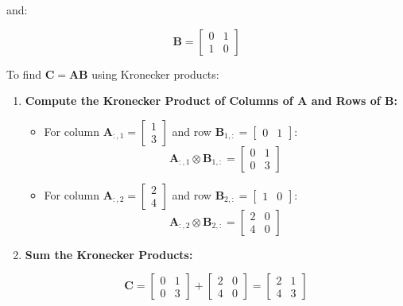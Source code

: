 \documentclass[
  letterpaper,
  DIV=11,
  numbers=noendperiod]{scrreprt}
\theoremstyle{plain}
\theoremstyle{definition}
\theoremstyle{remark}
\begin{document}
and:

\[\mathbf{B} = \begin{bmatrix}0 & 1 \\1 & 0\end{bmatrix}\]

To find \(\mathbf{C} = \mathbf{A} \mathbf{B}\) using Kronecker products:

\begin{enumerate}
\def\labelenumi{\arabic{enumi}.}
\item
  \textbf{Compute the Kronecker Product of Columns of \(\mathbf{A}\) and
  Rows of \(\mathbf{B}\):}

  \begin{itemize}
  \item
    For column
    \(\mathbf{A}_{:,1} = \begin{bmatrix} 1 \\ 3 \end{bmatrix}\) and row
    \(\mathbf{B}_{1,:} = \begin{bmatrix} 0 & 1 \end{bmatrix}\):
    \[\mathbf{A}_{:,1} \otimes \mathbf{B}_{1,:} = \begin{bmatrix}     0 & 1 \\     0 & 3     \end{bmatrix}\]
  \item
    For column
    \(\mathbf{A}_{:,2} = \begin{bmatrix} 2 \\ 4 \end{bmatrix}\) and row
    \(\mathbf{B}_{2,:} = \begin{bmatrix} 1 & 0 \end{bmatrix}\):
    \[\mathbf{A}_{:,2} \otimes \mathbf{B}_{2,:} = \begin{bmatrix}2 & 0 \\ 4 & 0\end{bmatrix}\]
  \end{itemize}
\item
  \textbf{Sum the Kronecker Products:}

  \[\mathbf{C} = \begin{bmatrix}0 & 1 \\ 0 & 3\end{bmatrix} +\begin{bmatrix} 2 & 0 \\ 4 & 0 \end{bmatrix}  = \begin{bmatrix} 2 & 1 \\ 4 & 3\end{bmatrix}\]
\end{enumerate}
\end{document}

